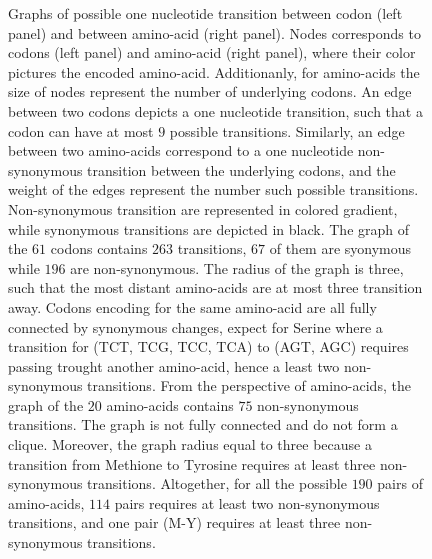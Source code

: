 \begin{figure}[htbp!]
	\caption[Graphs of \gls{codon} and amino-acid transitions]{
		\label{fig:graph-codons-aa}
		Graphs of possible one nucleotide {transition} between \gls{codon} (left panel) and between amino-acid (right panel).
		Nodes corresponds to \glspl{codon} (left panel) and amino-acid (right panel), where their color pictures the encoded amino-acid.
		Additionanly, for amino-acids the size of nodes represent the number of underlying \glspl{codon}.
		An edge between two \glspl{codon} depicts a one nucleotide {transition}, such that a \gls{codon} can have at most $9$ possible {transitions}.
		Similarly, an edge between two amino-acids correspond to a one nucleotide non-synonymous {transition} between the underlying \glspl{codon}, and the weight of the edges represent the number such possible {transitions}.
		Non-synonymous {transition} are represented in colored gradient, while synonymous {transitions} are depicted in black.
		The graph of the $61$ \glspl{codon} contains $263$ {transitions}, $67$ of them are syonymous while $196$ are non-synonymous.
		The radius of the graph is three, such that the most distant amino-acids are at most three {transition} away.
		Codons encoding for the same amino-acid are all fully connected by synonymous changes, expect for Serine where a {transition} for (TCT, TCG, TCC,	TCA) to (AGT, AGC) requires passing trought another amino-acid, hence a least two non-synonymous {transitions}.
		From the perspective of amino-acids, the graph of the $20$ amino-acids contains $75$ non-synonymous {transitions}.
		The graph is not fully connected and do not form a clique. Moreover, the graph radius equal to three because a {transition} from Methione to Tyrosine requires at least three non-synonymous {transitions}.
		Altogether, for all the possible $190$ pairs of amino-acids, $114$ pairs requires at least two non-synonymous {transitions}, and one pair (M-Y) requires at least three non-synonymous {transitions}.
	}
\end{figure}

